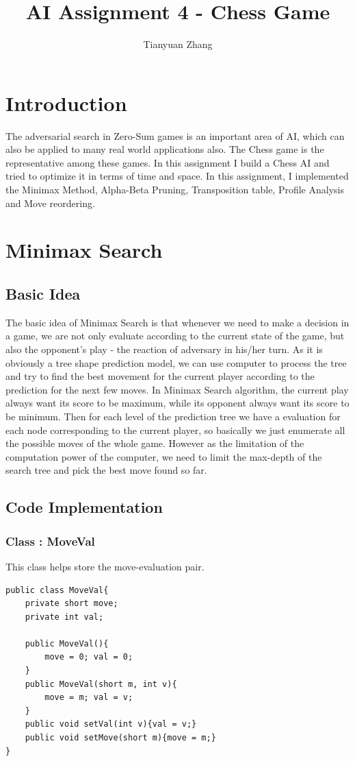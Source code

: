 \documentclass{article}
\title{AI Assignment 4 - Chess Game}
\author{Tianyuan Zhang}
\begin{document}
\maketitle

\section{Introduction}
The adversarial search in Zero-Sum games is an important area of AI, which can also be applied to many real world applications also. The Chess game is the representative among these games. In this assignment I build a Chess AI and tried to optimize it in terms of time and space. In this assignment, I implemented the Minimax Method, Alpha-Beta Pruning, Transposition table, Profile Analysis and Move reordering.

\section{Minimax Search}
\subsection{Basic Idea}
The basic idea of Minimax Search is that whenever we need to make a decision in a game, we are not only evaluate according to the current state of the game, but also the opponent's play - the reaction of adversary in his/her turn. As it is obviously a tree shape prediction model, we can use computer to process the tree and try to find the best movement for the current player according to the prediction for the next few moves. In Minimax Search algorithm, the current play always want its score to be maximum, while its opponent always want its score to be minimum. Then for each level of the prediction tree we have a evaluation for each node corresponding to the current player, so basically we just enumerate all the possible moves of the whole game. However as the limitation of the computation power of the computer, we need to limit the max-depth of the search tree and pick the best move found so far.

\subsection{Code Implementation}
\subsubsection{Class : MoveVal}
This class helps store the move-evaluation pair.
\begin{lstlisting}
public class MoveVal{
	private short move;
	private int val;
	
	public MoveVal(){
		move = 0; val = 0;
	}
	public MoveVal(short m, int v){
		move = m; val = v;
	}
	public void setVal(int v){val = v;}
	public void setMove(short m){move = m;}
}
\end{lstlisting}
\end{document}
